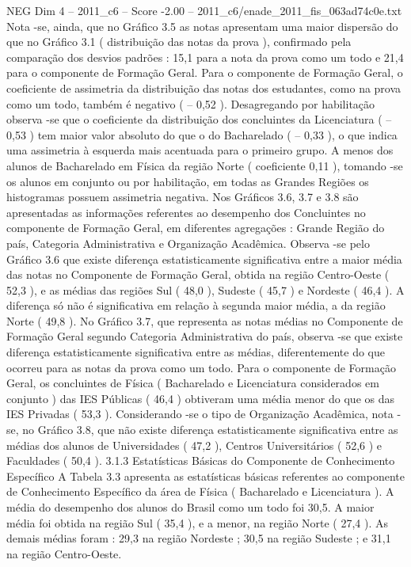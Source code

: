\begin{textsample}{NEG Dim 4 – 2011\_c6 – Score -2.00 – 2011\_c6/enade\_2011\_fis\_063ad74c0e.txt}
Nota -se, ainda, que no Gráfico 3.5 as notas apresentam uma maior dispersão do que no Gráfico 3.1 ( distribuição das notas da prova ), confirmado pela comparação dos desvios padrões : 15,1 para a nota da prova como um todo e 21,4 para o componente de Formação Geral.
Para o componente de Formação Geral, o coeficiente de assimetria da distribuição das notas dos estudantes, como na prova como um todo, também é negativo ( – 0,52 ).
Desagregando por habilitação observa -se que o coeficiente da distribuição dos concluintes da Licenciatura ( – 0,53 ) tem maior valor absoluto do que o do Bacharelado ( – 0,33 ), o que indica uma assimetria à esquerda mais acentuada para o primeiro grupo.
A menos dos alunos de Bacharelado em Física da região Norte ( coeficiente 0,11 ), tomando -se os alunos em conjunto ou por habilitação, em todas as Grandes Regiões os histogramas possuem assimetria negativa.
Nos Gráficos 3.6, 3.7 e 3.8 são apresentadas as informações referentes ao desempenho dos Concluintes no componente de Formação Geral, em diferentes agregações : Grande Região do país, Categoria Administrativa e Organização Acadêmica.
Observa -se pelo Gráfico 3.6 que existe diferença estatisticamente significativa entre a maior média das notas no Componente de Formação Geral, obtida na região Centro-Oeste ( 52,3 ), e as médias das regiões Sul ( 48,0 ), Sudeste ( 45,7 ) e Nordeste ( 46,4 ).
A diferença só não é significativa em relação à segunda maior média, a da região Norte ( 49,8 ).
No Gráfico 3.7, que representa as notas médias no Componente de Formação Geral segundo Categoria Administrativa do país, observa -se que existe diferença estatisticamente significativa entre as médias, diferentemente do que ocorreu para as notas da prova como um todo.
Para o componente de Formação Geral, os concluintes de Física ( Bacharelado e Licenciatura considerados em conjunto ) das IES Públicas ( 46,4 ) obtiveram uma média menor do que os das IES Privadas ( 53,3 ).
Considerando -se o tipo de Organização Acadêmica, nota -se, no Gráfico 3.8, que não existe diferença estatisticamente significativa entre as médias dos alunos de Universidades ( 47,2 ), Centros Universitários ( 52,6 ) e Faculdades ( 50,4 ). 3.1.3 Estatísticas Básicas do Componente de Conhecimento Específico A Tabela 3.3 apresenta as estatísticas básicas referentes ao componente de Conhecimento Específico da área de Física ( Bacharelado e Licenciatura ).
A média do desempenho dos alunos do Brasil como um todo foi 30,5.
A maior média foi obtida na região Sul ( 35,4 ), e a menor, na região Norte ( 27,4 ).
As demais médias foram : 29,3 na região Nordeste ; 30,5 na região Sudeste ; e 31,1 na região Centro-Oeste.

\end{textsample}
